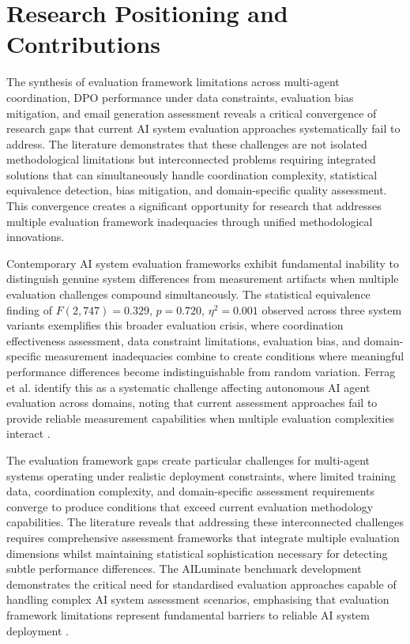 \section{Research Positioning and Contributions}

The synthesis of evaluation framework limitations across multi-agent coordination, DPO performance under data constraints, evaluation bias mitigation, and email generation assessment reveals a critical convergence of research gaps that current AI system evaluation approaches systematically fail to address. The literature demonstrates that these challenges are not isolated methodological limitations but interconnected problems requiring integrated solutions that can simultaneously handle coordination complexity, statistical equivalence detection, bias mitigation, and domain-specific quality assessment. This convergence creates a significant opportunity for research that addresses multiple evaluation framework inadequacies through unified methodological innovations.

Contemporary AI system evaluation frameworks exhibit fundamental inability to distinguish genuine system differences from measurement artifacts when multiple evaluation challenges compound simultaneously. The statistical equivalence finding of $F(2,747) = 0.329$, $p = 0.720$, $\eta^2 = 0.001$ observed across three system variants exemplifies this broader evaluation crisis, where coordination effectiveness assessment, data constraint limitations, evaluation bias, and domain-specific measurement inadequacies combine to create conditions where meaningful performance differences become indistinguishable from random variation. Ferrag et al. identify this as a systematic challenge affecting autonomous AI agent evaluation across domains, noting that current assessment approaches fail to provide reliable measurement capabilities when multiple evaluation complexities interact \cite{ferrag2025comprehensive_ai_review}.

The evaluation framework gaps create particular challenges for multi-agent systems operating under realistic deployment constraints, where limited training data, coordination complexity, and domain-specific assessment requirements converge to produce conditions that exceed current evaluation methodology capabilities. The literature reveals that addressing these interconnected challenges requires comprehensive assessment frameworks that integrate multiple evaluation dimensions whilst maintaining statistical sophistication necessary for detecting subtle performance differences. The AILuminate benchmark development demonstrates the critical need for standardised evaluation approaches capable of handling complex AI system assessment scenarios, emphasising that evaluation framework limitations represent fundamental barriers to reliable AI system deployment \cite{ghosh2025ailuminate_benchmark}.

